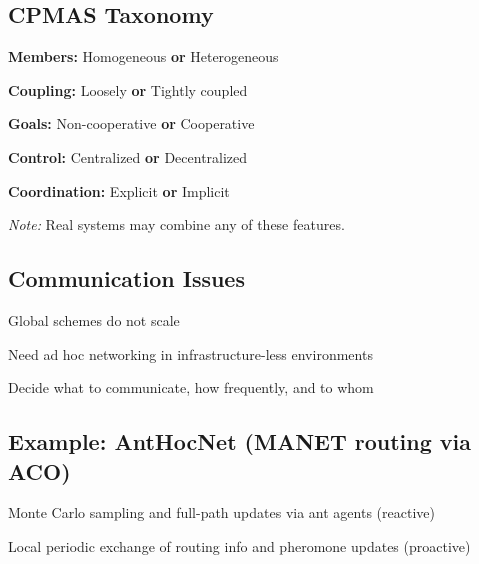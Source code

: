 \subsection*{CPMAS Taxonomy}
\begin{tightitemize}
  \item \textbf{Members:} Homogeneous \textbf{or} Heterogeneous
  \item \textbf{Coupling:} Loosely \textbf{or} Tightly coupled
  \item \textbf{Goals:} Non-cooperative \textbf{or} Cooperative
  \item \textbf{Control:} Centralized \textbf{or} Decentralized
  \item \textbf{Coordination:} Explicit \textbf{or} Implicit
\end{tightitemize}
\emph{Note:} Real systems may combine any of these features.

\subsection*{Communication Issues}
\begin{tightitemize}
    \item Global schemes do not scale
    \item Need ad hoc networking in infrastructure-less environments
    \item Decide what to communicate, how frequently, and to whom
\end{tightitemize}

\subsection*{Example: AntHocNet (MANET routing via ACO)}
\begin{tightitemize}
    \item Monte Carlo sampling and full-path updates via ant agents (reactive)
    \item Local periodic exchange of routing info and pheromone updates (proactive)
\end{tightitemize}

